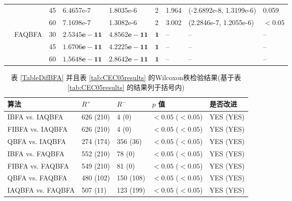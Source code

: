 \begin{longtable}[!tb]{p{0.3cm}p{1.2cm}p{0.3cm}p{2.45cm}p{2.45cm}p{0.5cm}p{1.2cm}p{4.5cm}p{1.5cm}}
             & &45 &6.4657e-7 & 1.8035e-6 &2 &1.964 &(-2.6892e-8, 1.3199e-6) &0.059  \\
             & &60 &7.1698e-7 & 1.3082e-6  &2 &3.002 &(2.2846e-7, 1.2055e-6) &$<0.05$ \\
 &FAQBFA &30 &$\bm{2.5345e-11}$  &$\bm{4.8562e-11}$  & $\bm{1}$&-- &-- &--  \\
             & &45 &$\bm{1.6706e-11}$ &$\bm{4.2225e-11}$   &$\bm{1}$ &-- &-- &--  \\
             & &60 &$\bm{1.5648e-11}$ &$\bm{2.8642e-11}$  & $\bm{1}$&-- &-- &--
\end{longtable}
\begin{table}[!htb]
\begin{center}
\caption{表 \ref{TableDifBFA} 并且表 \ref{tab:CEC05results} 的Wilcoxon秩检验结果(基于表 \ref{tab:CEC05results} 的结果列于括号内)}
\vspace{0.5em}\centering
\begin{tabularx}{\textwidth}{p{3.9cm}p{1.8cm}p{1.8cm}p{2.8cm}p{3.9cm}}
\hline
算法&   $R^{+}$   	&   $R^{-}$   &   $p$ 值 &是否改进\\
\midrule
IBFA vs. IAQBFA & 626 (210)   & 4 (0)   & $<0.05$ ($<0.05$)  &YES (YES)\\
FIBFA vs. IAQBFA &626 (210)     & 4  (0)  & $<0.05$ ($<0.05$) &YES (YES) \\
QBFA vs. IAQBFA & 274 (174)   & 356  (36)  &$<0.05$  ($<0.05$)  &YES (YES)\\
IBFA vs. FAQBFA &552 (210)     & 78  (0)  &$<0.05$ ($<0.05$)  &YES (YES)\\
FIBFA vs. FAQBFA &549  (210)    & 81  (0)  &$<0.05$  ($<0.05$) &YES (YES)\\
QBFA vs. FAQBFA & 480 (102)    & 150 (108)   &$<0.05$ ($<0.05$)  &YES  (YES)\\
IAQBFA vs. FAQBFA &507 (11)     &123 (199)   &$<0.05$ ($<0.05$)  &YES (YES)\\
\hline
\end{tabularx}
\label{Friedman_test}
\end{center}
\end{table}
